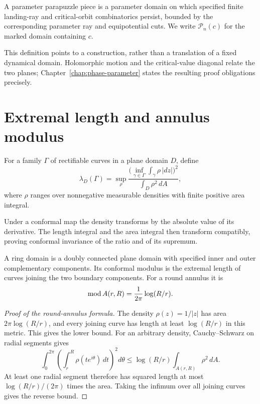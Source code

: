 \begin{definition}
\label{def:parapuzzle-piece}
A parameter parapuzzle piece is a parameter domain on which specified
finite landing-ray and critical-orbit combinatorics persist, bounded
by the corresponding parameter ray and equipotential cuts.
We write $\mathcal P_n(c)$ for the marked domain containing $c$.
\end{definition}

This definition points to a construction, rather than a translation
of a fixed dynamical domain.  Holomorphic motion and the critical-value
diagonal relate the two planes; Chapter~\ref{chap:phase-parameter}
states the resulting proof obligations precisely.

\section{Extremal length and annulus modulus}

\begin{definition}
For a family $\Gamma$ of rectifiable curves in a plane domain $D$,
define
\[
 \lambda_D(\Gamma)=
 \sup_\rho
 \frac{\bigl(\inf_{\gamma\in\Gamma}\int_\gamma\rho\,|dz|\bigr)^2}
      {\int_D\rho^2\,dA},
\]
where $\rho$ ranges over nonnegative measurable densities with finite
positive area integral.
\end{definition}

Under a conformal map the density transforms by the absolute value
of its derivative.  The length integral and the area integral then
transform compatibly, proving conformal invariance of the ratio and
of its supremum.

\begin{definition}
\label{def:annulus-modulus}
A ring domain is a doubly connected plane domain with specified inner
and outer complementary components.  Its conformal modulus is the
extremal length of curves joining the two boundary components.
For a round annulus it is
\[
 \operatorname{mod} A(r,R)=\frac{1}{2\pi}\log(R/r).
\]
\end{definition}

\begin{proof}[Proof of the round-annulus formula]
The density $\rho(z)=1/|z|$ has area
$2\pi\log(R/r)$, and every joining curve has length at least
$\log(R/r)$ in this metric.  This gives the lower bound.
For an arbitrary density, Cauchy--Schwarz on radial segments gives
\[
 \int_0^{2\pi}\left(\int_r^R\rho(te^{i\theta})\,dt\right)^2d\theta
 \le\log(R/r)\int_{A(r,R)}\rho^2\,dA.
\]
At least one radial segment therefore has squared length at most
$\log(R/r)/(2\pi)$ times the area.  Taking the infimum over all
joining curves gives the reverse bound.
\end{proof}

